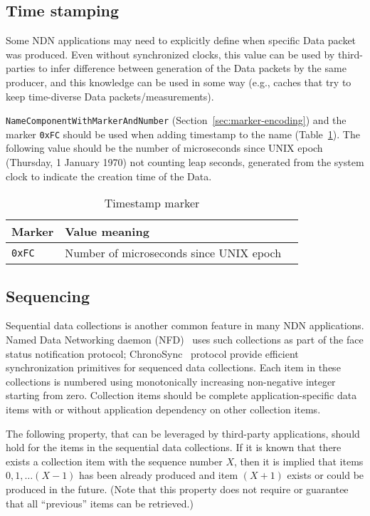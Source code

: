 \subsection{Time stamping}
\label{sec:timestamp}

Some NDN applications may need to explicitly define when specific Data packet was produced.
Even without synchronized clocks, this value can be used by third-parties to infer difference between generation of the Data packets by the same producer, and this knowledge can be used in some way (e.g., caches that try to keep time-diverse Data packets/measurements).

\texttt{NameComponentWithMarkerAndNumber} (Section~\ref{sec:marker-encoding}) and the marker \verb|0xFC| should be used when adding timestamp to the name (Table~\ref{tab:timestamp}).
The following value should be the number of microseconds since UNIX epoch (Thursday, 1 January 1970) not counting leap seconds, generated from the system clock to indicate the creation time of the Data.

\begin{table}[h!]
  \centering
  \caption{Timestamp marker}
  \label{tab:timestamp}
  \begin{tabular}{|l|l|l|}
    \hline
    Marker & Value meaning \\
    \hline \hline
    \verb|0xFC| & Number of microseconds since UNIX epoch \\
    \hline
  \end{tabular}
\end{table}


\subsection{Sequencing}
\label{sec:sequencing}

Sequential data collections is another common feature in many NDN applications.
Named Data Networking daemon (NFD)~\cite{nfd} uses such collections as part of the face status notification protocol; ChronoSync~\cite{ChronoSync} protocol provide efficient synchronization primitives for sequenced data collections.
Each item in these collections is numbered using monotonically increasing non-negative integer starting from zero.
Collection items should be complete application-specific data items with or without application dependency on other collection items.

The following property, that can be leveraged by third-party applications, should hold for the items in the sequential data collections.
If it is known that there exists a collection item with the sequence number $X$, then it is implied that items $0, 1, \ldots (X-1)$ has been already produced and item $(X+1)$ exists or could be produced in the future.
(Note that this property does not require or guarantee that all ``previous'' items can be retrieved.)


